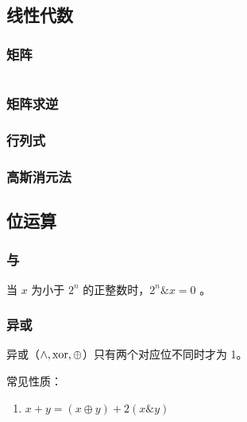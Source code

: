 \documentclass[a4paper, twoside]{article}
\begin{document}
\subsection{线性代数}
    \subsubsection{矩阵}
    \inputminted{cpp}{../src/数学/矩阵.cpp}

    \subsubsection{矩阵求逆}

    \subsubsection{行列式}

    \subsubsection{高斯消元法}

\subsection{位运算}
    \subsubsection{与}
    当 $x$ 为小于 $2^{n}$ 的正整数时，$2^{n} \mathrel{\&} x=0$ 。

    \subsubsection{异或}
    异或（$\wedge, \rm{xor}, \oplus$）只有两个对应位不同时才为 1。
    
    常见性质：
    \begin{enumerate}
        \item $x + y = (x \oplus y) + 2(x \mathrel{\&} y) $
    \end{enumerate} 
\end{document}
